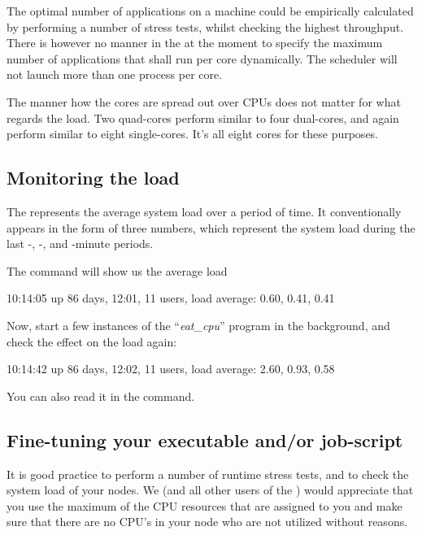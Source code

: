 The optimal number of applications on a machine could be empirically calculated
by performing a number of stress tests, whilst checking the highest throughput.
There is however no manner in the \hpc at the moment to specify the maximum
number of applications that shall run per core dynamically. The \hpc scheduler
will not launch more than one process per core.

The manner how the cores are spread out over CPUs does not matter for what
regards the load. Two quad-cores perform similar to four dual-cores, and again
perform similar to eight single-cores. It's all eight cores for these purposes.

\subsection{Monitoring the load}

The  represents the average system load over a period of
time. It conventionally appears in the form of three numbers, which represent
the system load during the last -, -, and
-minute periods.

The  command will show us the average load
\begin{prompt}
10:14:05 up 86 days, 12:01, 11 users, load average: 0.60, 0.41, 0.41
\end{prompt}

Now, start a few instances of the ``\emph{eat\_cpu}'' program in the
background, and check the effect on the load again:

\begin{prompt}
10:14:42 up 86 days, 12:02, 11 users, load average: 2.60, 0.93, 0.58
\end{prompt}

You can also read it in the  command.
\subsection{Fine-tuning your executable and/or job-script}

It is good practice to perform a number of runtime stress tests, and to check
the system load of your nodes. We (and all other users of the \hpc) would
appreciate that you use the maximum of the CPU resources that are assigned to
you and make sure that there are no CPU's in your node who are not utilized
without reasons.

